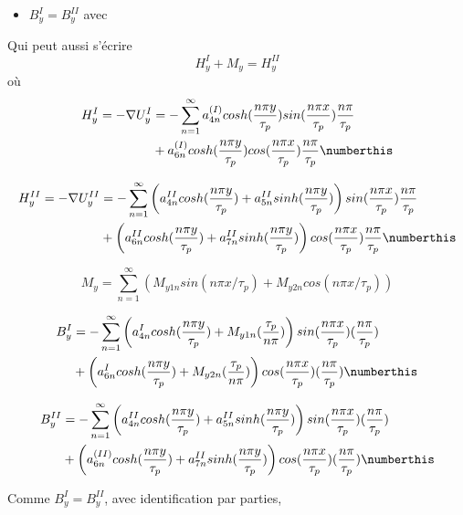 \begin{itemize}
    \item \textbf{$B_y^{I} = B_y^{II}$} avec
\end{itemize}
Qui peut aussi s'écrire 
\begin{equation}
    H_y^{I}+M_y = H_y^{II}
\end{equation}
où 
\begin{align*}
    H_y^{I} = -\nabla U_y^{I} &= -\sum_{n=1}^\infty a_{4n}^{(I)}cosh(\frac{n\pi y}{\tau_p})sin(\frac{n\pi x}{\tau_p})\frac{n\pi}{\tau_p}\\
    &+a_{6n}^{(I)}cosh(\frac{n\pi y}{\tau_p})cos(\frac{n\pi x}{\tau_p})\frac{n\pi}{\tau_p}\numberthis
\end{align*}

\begin{align*}
    H_y^{II} = -\nabla U_y^{II} &= -\sum_{n=1}^\infty \left(a_{4n}^{II}cosh(\frac{n\pi y}{\tau_p})+a_{5n}^{II}sinh(\frac{n\pi y}{\tau_p})\right)sin(\frac{n\pi x}{\tau_p})\frac{n\pi}{\tau_p}\\
    &+ \left(a_{6n}^{II}cosh(\frac{n\pi y}{\tau_p})+a_{7n}^{II}sinh(\frac{n\pi y}{\tau_p})\right)cos(\frac{n\pi x}{\tau_p})\frac{n\pi}{\tau_p}\numberthis
\end{align*}

\begin{equation}
    M_y = \sum_{n=1}^\infty(M_{y1n}sin(n\pi x/\tau_p)+M_{y2n}cos(n\pi x/\tau_p))
\end{equation}

\begin{align*}
    B_y^{I} &= -\sum_{n=1}^\infty \left(a_{4n}^{I}cosh(\frac{n\pi y}{\tau_p})+M_{y1n}(\frac{\tau_p}{n\pi})\right)sin(\frac{n\pi x}{\tau_p})(\frac{n\pi}{\tau_p})\\
    &+ \left(a_{6n}^{I}cosh(\frac{n\pi y}{\tau_p})+M_{y2n}(\frac{\tau_p}{n\pi})\right)cos(\frac{n\pi x}{\tau_p})(\frac{n\pi}{\tau_p})\numberthis
\end{align*}

\begin{align*}
    B_y^{II}&=-\sum_{n=1}^\infty \left(a_{4n}^{II}cosh(\frac{n\pi y}{\tau_p})+a_{5n}^{II}sinh(\frac{n\pi y}{\tau_p})\right)sin(\frac{n\pi x}{\tau_p})(\frac{n\pi}{\tau_p})\\
    &+ \left(a_{6n}^{(II)}cosh(\frac{n\pi y}{\tau_p})+a_{7n}^{II}sinh(\frac{n\pi y}{\tau_p})\right)cos(\frac{n\pi x}{\tau_p})(\frac{n\pi}{\tau_p})\numberthis
\end{align*}

Comme $B_y^{I}=B_y^{II}$, avec identification par parties,

